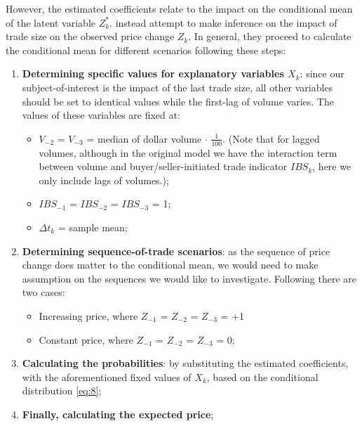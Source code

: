 However, the estimated coefficients relate to the impact on the conditional mean of the latent variable $Z_k^*$. \citet{hausman1992} instead attempt to make inference on the impact of trade size on the observed price change $Z_k$. In general, they proceed to calculate the conditional mean for different scenarios following these steps:
\begin{enumerate}
    \item \textbf{Determining specific values for explanatory variables $X_k$}: since our subject-of-interest is the impact of the last trade size, all other variables should be set to identical values while the first-lag of volume varies. The values of these variables are fixed at:
    \begin{itemize}
    \item $V_{-2}$ = $V_{-3}$ = median of dollar volume $\cdot$ $\frac{1}{100}$. 
    (Note that for lagged volumes, although in the original model we have the interaction term between volume and buyer/seller-initiated trade indicator $IBS_k$, here we only include lags of volumes.);
    \item $IBS_{-1}$ = $IBS_{-2}$ = $IBS_{-3}$ = 1;
    \item $\Delta t_k$ = sample mean;
    \end{itemize}
    \item \textbf{Determining sequence-of-trade scenarios}: as the sequence of price change does matter to the conditional mean, we would need to make assumption on the sequences we would like to investigate. Following \citet{hausman1992} there are two cases:
    \begin{itemize}
    \item Increasing price, where $Z_{-1}$ = $Z_{-2}$ = $Z_{-3}$ = +1
    \item Constant price, where $Z_{-1}$ = $Z_{-2}$ = $Z_{-3}$ = 0;
    \end{itemize}
    \item \textbf{Calculating the probabilities}: by substituting the estimated coefficients, with the aforementioned fixed values of $X_k$, based on the conditional distribution \eqref{eq:8};
    \item \textbf{Finally, calculating the expected price};
\end{enumerate}



